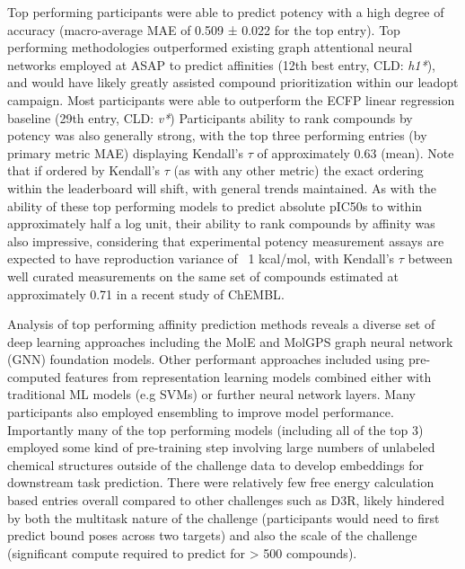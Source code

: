 \documentclass[journal=jcim,manuscript=article]{achemso}
\begin{document}
Top performing participants were able to predict potency with a high degree of accuracy (macro-average MAE of 0.509 ± 0.022 for the top entry). Top performing methodologies outperformed existing graph attentional neural networks employed at ASAP to predict affinities (12th best entry, CLD: \textit{h1*}), and would have likely greatly assisted compound prioritization within our leadopt campaign. Most participants were able to outperform the ECFP linear regression baseline (29th entry, CLD: \textit{v*}) Participants ability to rank compounds by potency was also generally strong, with the top three performing entries (by primary metric MAE) displaying Kendall's $\tau$ of approximately 0.63 (mean). Note that if ordered by Kendall's $\tau$ (as with any other metric) the exact ordering within the leaderboard will shift, with general trends maintained. As with the ability of these top performing models to predict absolute pIC50s to within approximately half a log unit, their ability to rank compounds by affinity was also impressive, considering that experimental potency measurement assays are expected to have reproduction variance of ~1 kcal/mol\cite{ross_maximal_2023}, with Kendall's $\tau$ between well curated measurements on the same set of compounds estimated at approximately 0.71 in a recent study of ChEMBL\cite{landrum_combining_2024}.

Analysis of top performing affinity prediction methods reveals a diverse set of deep learning approaches including the MolE\cite{mendez-lucio_mole_2024} and MolGPS\cite{sypetkowski2024scalabilitygnnsmoleculargraphs} graph neural network (GNN) foundation models. Other performant approaches included using pre-computed features from representation learning models combined either with traditional ML models (e.g SVMs) or further neural network layers. Many participants also employed ensembling to improve model performance.  Importantly many of the top performing models (including all of the top 3) employed some kind of pre-training step involving large numbers of unlabeled chemical structures outside of the challenge data to develop embeddings for downstream task prediction. There were relatively few free energy calculation based entries overall compared to other challenges such as D3R\cite{parks_gaieb_chiu_yang_shao_walters_jansen_mcgaughey_lewis_bembenek_et}, likely hindered by both the multitask nature of the challenge (participants would need to first predict bound poses across two targets) and also the scale of the challenge (significant compute required to predict for > 500 compounds).
\end{document}
